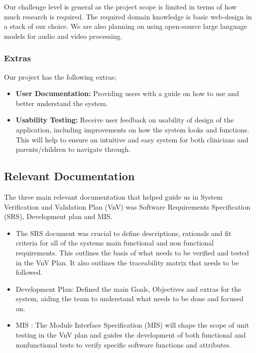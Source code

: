 \documentclass[12pt, titlepage]{article}
\begin{document}
Our challenge level is general as the project scope is limited in terms of how much
research is required. The required domain knowledge is basic web-design in a
stack of our choice. We are also planning on using open-source large language
models for audio and video processing.

\subsubsection{Extras}
Our project has the following extras;
\begin{itemize}
  \item \textbf{User Documentation: } Providing users with a guide on how to use and
  better understand the system. 
  \item \textbf{Usability Testing: } Receive user feedback on usability of design of the application, 
including improvements on how the system looks and functions. This will help to ensure an 
intuitive and easy system for both clinicians and parents/children to navigate through.
\end{itemize}


\subsection{Relevant Documentation}

  The three main relevant documentation that helped guide us in System Verification and Validation Plan (VnV) was Software Requirements Specification
  (SRS), Development plan and MIS.  
  
  \begin{itemize}
    \item The SRS document was crucial to define descriptions, rationals and fit criteria for all of the systems main functional 
    and non functional requirements. This outlines the basis of what needs to be verified and tested in the VnV Plan. It also outlines the 
    traceability matrix that needs to be followed.
    \item Development Plan: Defined the main Goals, Objectives and extras for the system, aiding the team to understand what
     needs to be done and focused on. 
    \item MIS : The Module Interface Specification (MIS) will shape the scope of unit testing in the VnV plan and guides 
    the development of both functional and nonfunctional tests to verify specific software functions and attributes.
  \end{itemize}
\end{document}
